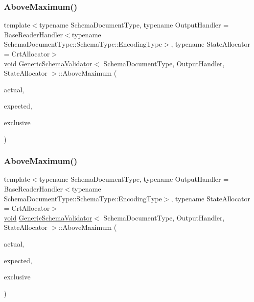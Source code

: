 \subsubsection{\texorpdfstring{Above\+Maximum()}{AboveMaximum()}\hspace{0.1cm}{\footnotesize\ttfamily [1/3]}}
{\footnotesize\ttfamily template$<$typename Schema\+Document\+Type, typename Output\+Handler = Base\+Reader\+Handler$<$typename Schema\+Document\+Type\+::\+Schema\+Type\+::\+Encoding\+Type$>$, typename State\+Allocator = Crt\+Allocator$>$ \\
\hyperlink{imgui__impl__opengl3__loader_8h_ac668e7cffd9e2e9cfee428b9b2f34fa7}{void} \hyperlink{classGenericSchemaValidator}{Generic\+Schema\+Validator}$<$ Schema\+Document\+Type, Output\+Handler, State\+Allocator $>$\+::Above\+Maximum (\begin{DoxyParamCaption}\item[{\hyperlink{stdint_8h_a414156feea104f8f75b4ed9e3121b2f6}{int64\+\_\+t}}]{actual,  }\item[{const \hyperlink{classGenericSchemaValidator_a3c004e35c7eb9fa5a28c0ccfb8ac62dc}{S\+Value} \&}]{expected,  }\item[{bool}]{exclusive }\end{DoxyParamCaption})\hspace{0.3cm}{\ttfamily [inline]}}

\mbox{\label{classGenericSchemaValidator_a9262c73768789eb7cf8dc271cfec7f96}} 
\subsubsection{\texorpdfstring{Above\+Maximum()}{AboveMaximum()}\hspace{0.1cm}{\footnotesize\ttfamily [2/3]}}
{\footnotesize\ttfamily template$<$typename Schema\+Document\+Type, typename Output\+Handler = Base\+Reader\+Handler$<$typename Schema\+Document\+Type\+::\+Schema\+Type\+::\+Encoding\+Type$>$, typename State\+Allocator = Crt\+Allocator$>$ \\
\hyperlink{imgui__impl__opengl3__loader_8h_ac668e7cffd9e2e9cfee428b9b2f34fa7}{void} \hyperlink{classGenericSchemaValidator}{Generic\+Schema\+Validator}$<$ Schema\+Document\+Type, Output\+Handler, State\+Allocator $>$\+::Above\+Maximum (\begin{DoxyParamCaption}\item[{\hyperlink{stdint_8h_aec6fcb673ff035718c238c8c9d544c47}{uint64\+\_\+t}}]{actual,  }\item[{const \hyperlink{classGenericSchemaValidator_a3c004e35c7eb9fa5a28c0ccfb8ac62dc}{S\+Value} \&}]{expected,  }\item[{bool}]{exclusive }\end{DoxyParamCaption})\hspace{0.3cm}{\ttfamily [inline]}}

